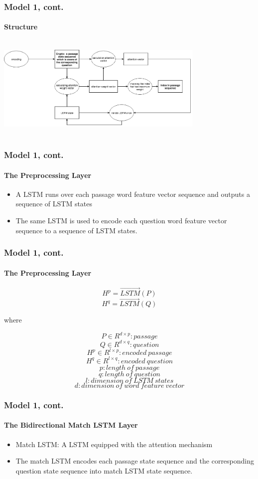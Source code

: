 \documentclass{beamer}
\begin{document}
\begin{frame} \frametitle{Model 1, cont.}\framesubtitle{Structure}
    \begin{center}
        \includegraphics[width=10cm, height=5cm]{figures/model1_decoder.png}
    \end{center}
\end{frame}

\begin{frame} \frametitle{Model 1, cont.}\framesubtitle{The Preprocessing Layer}

    \begin{itemize}
        \item A LSTM runs over each passage word feature vector sequence and outputs a sequence of LSTM states
        \item The same LSTM is used to encode each question word feature vector sequence to a sequence of LSTM states.
    \end{itemize}
\end{frame}

\begin{frame} \frametitle{Model 1, cont.}\framesubtitle{The Preprocessing Layer}
    $$H^p = \overrightarrow{LSTM}(P)$$
    $$H^q = \overrightarrow{LSTM}(Q)$$

    where

    $$P\in R^{d \times p}: passage$$
    $$Q\in R^{d \times q}: question$$
    $$H^p\in R^{l \times p}: encoded\ passage$$
    $$H^q\in R^{l \times q}: encoded\ question$$
    $$p: length \ of\ passage$$
    $$q: length\ of\ question$$
    $$l: dimension\ of\ LSTM\ states$$
    $$d: dimension\ of\ word\ feature\ vector$$

\end{frame}

\begin{frame} \frametitle{Model 1, cont.}\framesubtitle{The Bidirectional Match LSTM Layer}
    \begin{itemize}
        \item Match LSTM: A LSTM equipped with the attention mechanism
        \item The match LSTM encodes each passage state sequence and the corresponding question state sequence into match LSTM state sequence.
    \end{itemize}
\end{frame}
\end{document}

